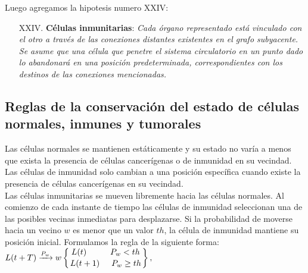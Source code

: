 Luego agregamos la hipotesis numero XXIV:

\begin{itemize}
    \item [XXIV.] \textbf{C\'elulas inmunitarias}: \emph{Cada \'organo representado est\'a vinculado con el otro a trav\'es de las conexiones distantes existentes en el grafo subyacente. Se asume que una c\'elula que penetre el sistema circulatorio en un punto dado lo abandonar\'a en una posici\'on predeterminada, correspondientes con los destinos de las conexiones mencionadas.} \label{XXIV}
    \end{itemize}

\subsection{Reglas de la conservaci\'on del estado de c\'elulas normales, inmunes y tumorales}

Las c\'elulas normales se mantienen est\'aticamente y su estado no var\'ia a menos que exista la presencia de c\'elulas cancer\'igenas o de inmunidad en su vecindad.\\
Las c\'elulas de inmunidad solo cambian a una posici\'on espec\'ifica cuando existe la presencia de c\'elulas cancer\'igenas en su vecindad.\\
Las c\'elulas inmunitarias se mueven libremente hacia las c\'elulas normales.
Al comienzo de cada instante de tiempo las c\'elulas de inmunidad seleccionan una de las posibles vecinas inmediatas para desplazarse. Si la probabilidad de moverse hacia un vecino $w$ es menor que un valor $th$, la c\'elula de inmunidad mantiene su posici\'on inicial. Formulamos la regla de la siguiente forma:\\
$L(t+T) \xrightarrow{P_{w}} w  \displaystyle \left\{ {L(t) \hspace{1cm} P_w<th \atop L(t + 1) \hspace{.5cm} P_w \geq th } \right\},$\\

